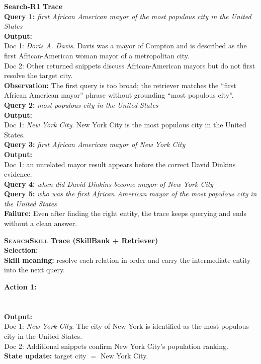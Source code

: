 \documentclass{article}
\newcommand{\Ours}{\textsc{SearchSkill}\xspace}
\begin{document}
\casedash
\noindent\textcolor{red!75!black}{\textbf{Search-R1 Trace}}\\
\textbf{Query 1:} \emph{first African American mayor of the most populous city in the United States}\\
\textbf{Output:}\\
Doc 1: \emph{Doris A. Davis}. Davis was a mayor of Compton and is described as the first African-American woman mayor of a metropolitan city.\\
Doc 2: Other returned snippets discuss African-American mayors but do not first resolve the target city.\\
\textbf{Observation:} The first query is too broad; the retriever matches the ``first African American mayor'' phrase without grounding ``most populous city''.\\
\textbf{Query 2:} \emph{most populous city in the United States}\\
\textbf{Output:}\\
Doc 1: \emph{New York City}. New York City is the most populous city in the United States.\\
\textbf{Query 3:} \emph{first African American mayor of New York City}\\
\textbf{Output:}\\
Doc 1: an unrelated mayor result appears before the correct David Dinkins evidence.\\
\textbf{Query 4:} \emph{when did David Dinkins become mayor of New York City}\\
\textbf{Query 5:} \emph{who was the first African American mayor of the most populous city in the United States}\\
\textbf{Failure:} Even after finding the right entity, the trace keeps querying and ends without a clean answer.

\casedash
\noindent\textcolor{blue!75!black}{\textbf{\Ours Trace (SkillBank + Retriever)}}\\
\textbf{Selection:} \\
\textbf{Skill meaning:} resolve each relation in order and carry the intermediate entity into the next query.

\textbf{Action 1:}\\
\\
\\
\textbf{Output:}\\
Doc 1: \emph{New York City}. The city of New York is identified as the most populous city in the United States.\\
Doc 2: Additional snippets confirm New York City's population ranking.\\
\textbf{State update:} target city \(=\) New York City.
\end{document}
